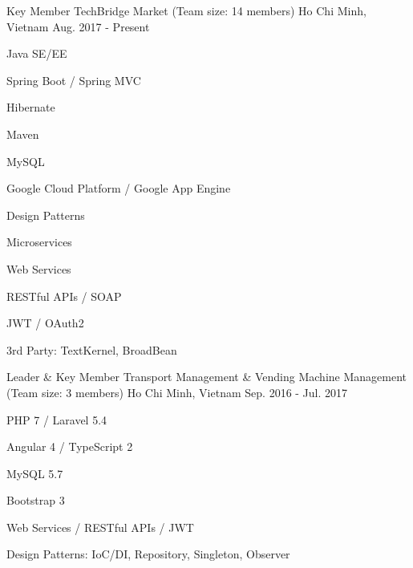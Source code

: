 

\begin{cventries}

  \cventry
    {Key Member} %
    {TechBridge Market (Team size: 14 members)} %
    {Ho Chi Minh, Vietnam} %
    {Aug. 2017 - Present} %
    {
      \begin{cvitems} %
        \item {Java SE/EE}
        \item {Spring Boot / Spring MVC}
        \item {Hibernate}
        \item {Maven}
        \item {MySQL}
        \item {Google Cloud Platform / Google App Engine}
        \item {Design Patterns}
        \item {Microservices}
        \item {Web Services}
        \item {RESTful APIs / SOAP}
        \item {JWT / OAuth2}
        \item {3rd Party: TextKernel, BroadBean}
      \end{cvitems}
    }

  \cventry
    {Leader \& Key Member} %
    {Transport Management \& Vending Machine Management (Team size: 3 members)} %
    {Ho Chi Minh, Vietnam} %
    {Sep. 2016 - Jul. 2017} %
    {
      \begin{cvitems} %
        \item {PHP 7 / Laravel 5.4}
        \item {Angular 4 / TypeScript 2}
        \item {MySQL 5.7}
        \item {Bootstrap 3}
        \item {Web Services / RESTful APIs / JWT}
        \item {Design Patterns: IoC/DI, Repository, Singleton, Observer}
      \end{cvitems}
    }


\end{cventries}
